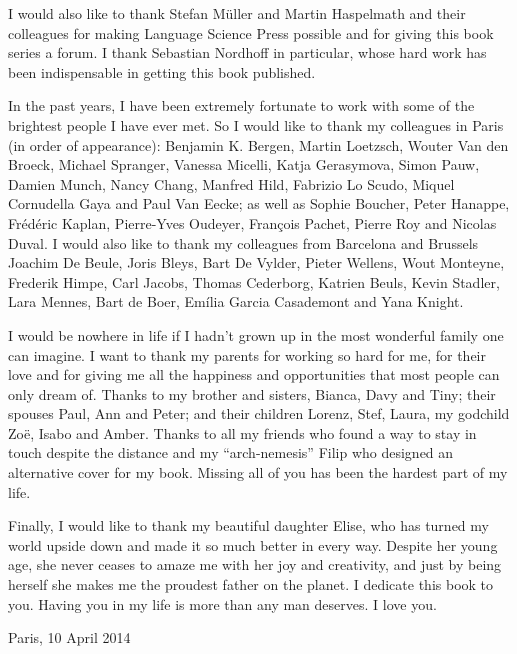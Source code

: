 I would also like to thank Stefan M\"{u}ller and Martin Haspelmath and their colleagues for making Language Science Press possible and for giving this book series a forum. I thank Sebastian Nordhoff in particular, whose hard work has been indispensable in getting this book published.

In the past years, I have been extremely fortunate to work with some of the brightest people I have ever met. So I would like to thank my colleagues in Paris (in order of appearance): Benjamin K. Bergen, Martin Loetzsch, Wouter Van den Broeck, Michael Spranger, Vanessa Micelli, Katja Gerasymova, Simon Pauw, Damien Munch, Nancy Chang, Manfred Hild, Fabrizio Lo Scudo, Miquel Cornudella Gaya and Paul Van Eecke; as well as Sophie Boucher, Peter Hanappe, Fr\'{e}d\'{e}ric Kaplan, Pierre-Yves Oudeyer, Fran\c{c}ois Pachet, Pierre Roy and Nicolas Duval. I would also like to thank my colleagues from Barcelona and Brussels Joachim De Beule, Joris Bleys, Bart De Vylder, Pieter Wellens, Wout Monteyne, Frederik Himpe, Carl Jacobs, Thomas Cederborg, Katrien Beuls, Kevin Stadler, Lara Mennes, Bart de Boer, Em\'{i}lia Garcia Casademont and Yana Knight.

I would be nowhere in life if I hadn't grown up in the most wonderful family one can imagine. I want to thank my parents for working so hard for me, for their love and for giving me all the happiness and opportunities that most people can only dream of. Thanks to my brother and sisters, Bianca, Davy and Tiny; their spouses Paul, Ann and Peter; and their children Lorenz, Stef, Laura, my godchild Zo\"e, Isabo and Amber. Thanks to all my friends who found a way to stay in touch despite the distance and my ``arch-nemesis'' Filip who designed an alternative cover for my book. Missing all of you has been the hardest part of my life.

\vspace{1cm}
\noindent Finally, I would like to thank my beautiful daughter Elise, who has turned my world upside down and made it so much better in every way. Despite her young age, she never ceases to amaze me with her joy and creativity, and just by being herself she makes me the proudest father on the planet. I dedicate this book to you. Having you in my life is more than any man deserves. I love you.

\begin{flushright}
Paris, 10 April 2014
\end{flushright}
